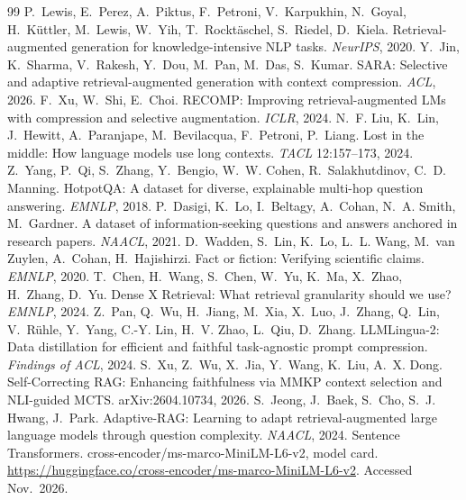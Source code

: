\documentclass[10pt,twocolumn,letterpaper]{article}
\begin{document}
\clearpage
\onecolumn
\begin{thebibliography}{99}\small
{} P.~Lewis, E.~Perez, A.~Piktus, F.~Petroni, V.~Karpukhin, N.~Goyal, H.~K\"{u}ttler, M.~Lewis, W.~Yih, T.~Rockt\"{a}schel, S.~Riedel, D.~Kiela. Retrieval-augmented generation for knowledge-intensive NLP tasks. \emph{NeurIPS}, 2020.
 Y.~Jin, K.~Sharma, V.~Rakesh, Y.~Dou, M.~Pan, M.~Das, S.~Kumar. SARA: Selective and adaptive retrieval-augmented generation with context compression. \emph{ACL}, 2026.
 F.~Xu, W.~Shi, E.~Choi. RECOMP: Improving retrieval-augmented LMs with compression and selective augmentation. \emph{ICLR}, 2024.
 N.~F. Liu, K.~Lin, J.~Hewitt, A.~Paranjape, M.~Bevilacqua, F.~Petroni, P.~Liang. Lost in the middle: How language models use long contexts. \emph{TACL} 12:157--173, 2024.
 Z.~Yang, P.~Qi, S.~Zhang, Y.~Bengio, W.~W. Cohen, R.~Salakhutdinov, C.~D. Manning. HotpotQA: A dataset for diverse, explainable multi-hop question answering. \emph{EMNLP}, 2018.
 P.~Dasigi, K.~Lo, I.~Beltagy, A.~Cohan, N.~A. Smith, M.~Gardner. A dataset of information-seeking questions and answers anchored in research papers. \emph{NAACL}, 2021.
 D.~Wadden, S.~Lin, K.~Lo, L.~L. Wang, M.~van Zuylen, A.~Cohan, H.~Hajishirzi. Fact or fiction: Verifying scientific claims. \emph{EMNLP}, 2020.
 T.~Chen, H.~Wang, S.~Chen, W.~Yu, K.~Ma, X.~Zhao, H.~Zhang, D.~Yu. Dense X Retrieval: What retrieval granularity should we use? \emph{EMNLP}, 2024.
 Z.~Pan, Q.~Wu, H.~Jiang, M.~Xia, X.~Luo, J.~Zhang, Q.~Lin, V.~R\"uhle, Y.~Yang, C.-Y. Lin, H.~V. Zhao, L.~Qiu, D.~Zhang. LLMLingua-2: Data distillation for efficient and faithful task-agnostic prompt compression. \emph{Findings of ACL}, 2024.
 S.~Xu, Z.~Wu, X.~Jia, Y.~Wang, K.~Liu, A.~X. Dong. Self-Correcting RAG: Enhancing faithfulness via MMKP context selection and NLI-guided MCTS. arXiv:2604.10734, 2026.
 S.~Jeong, J.~Baek, S.~Cho, S.~J. Hwang, J.~Park. Adaptive-RAG: Learning to adapt retrieval-augmented large language models through question complexity. \emph{NAACL}, 2024.
 Sentence Transformers. cross-encoder/ms-marco-MiniLM-L6-v2, model card. \url{https://huggingface.co/cross-encoder/ms-marco-MiniLM-L6-v2}. Accessed Nov.\ 2026.
\end{thebibliography}
\end{document}
